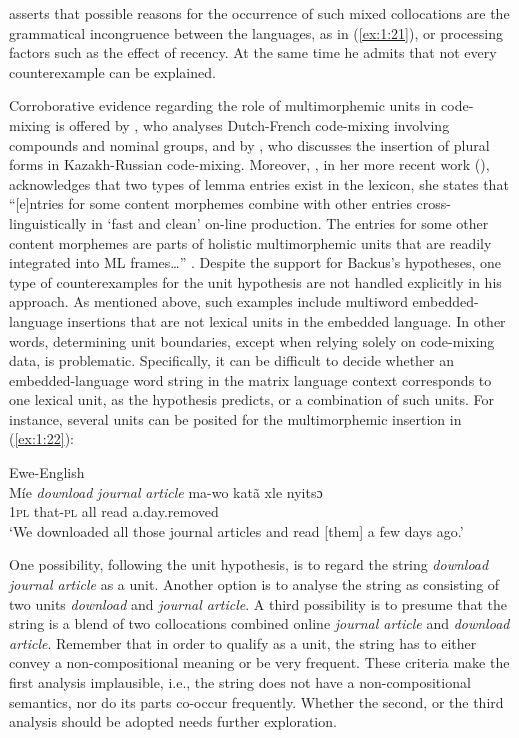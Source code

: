 \noindent \citet[113]{backus-units-2003} asserts that possible reasons for the occurrence of such mixed collocations are the grammatical incongruence between the languages, as in (\ref{ex:1:21}), or processing factors such as the effect of recency. At the same time he admits that not every counterexample can be explained.

Corroborative evidence regarding the role of multimorphemic units in code-mixing is offered by \citet{treffers-daller-2005}, who analyses Dutch-French code-mixing involving compounds and nominal groups, and by \citet[67]{muhamedowa-untersuchung-2006}, who discusses the insertion of plural forms in Kazakh-Russian code-mixing. Moreover, \citeauthor{myers-scotton-2006}, in her more recent work (\citeyear{myers-scotton-2006}), acknowledges that two types of lemma entries exist in the lexicon, she states that ``[e]ntries for some content morphemes combine with other entries cross-linguistically in `fast and clean' on-line production. The entries for some other content morphemes are parts of holistic multimorphemic units that are readily integrated into ML frames\dots'' \citep[][211]{myers-scotton-2006}. Despite the support for Backus's hypotheses, one type of counterexamples for the unit hypothesis are not handled explicitly in his approach. As mentioned above, such examples include multiword embedded-language insertions that are not lexical units in the embedded language. In other words, determining unit boundaries, except when relying solely on code-mixing data, is problematic. Specifically, it can be difficult to decide whether an embedded-language word string in the matrix language context corresponds to one lexical unit, as the hypothesis predicts, or a combination of such units. For instance, several units can be posited for the multimorphemic insertion in (\ref{ex:1:22}): 

\ea{}\label{ex:1:22}
Ewe-English \citep[22]{amuzu-2013}\\
\gll Míe \textit{download} \textit{journal} \textit{article} ma-wo katã xle nyitsɔ\\
1\textsc{pl} {} {} {} that-\textsc{pl} all read a.day.removed\\
\glt `We downloaded all those journal articles and read [them] a few days ago.'
\z

\noindent One possibility, following the unit hypothesis, is to regard the string \textit{download journal article} as a unit. Another option is to analyse the string as consisting of two units \textit{download} and \textit{journal article}. A third possibility is to presume that the string is a blend of two collocations combined online \textit{journal article} and \textit{download article}. Remember that in order to qualify as a unit, the string has to either convey a non-compositional meaning or be very frequent. These criteria make the first analysis implausible, i.e., the string does not have a non-compositional semantics, nor do its parts co-occur frequently. Whether the second, or the third analysis should be adopted needs further exploration.

